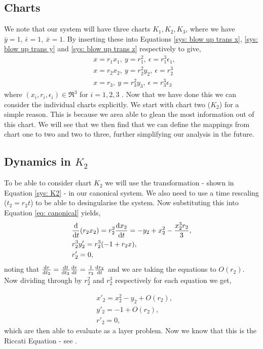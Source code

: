 \subsection{Charts}
We note that our system will have three charts $ K_1,K_2,K_3 $, where we have $ \bar{y}=1, \ \bar{\epsilon}=1, \ \bar{x}=1 $. By inserting these into Equations \ref{sys: blow up trans x}, \ref{sys: blow up trans y} and \ref{sys: blow up trans z} respectively to give, 
\begin{subequations}
	\begin{align}
	&x=r_1x_1, \ y=r_1^2, \ \epsilon=r_1^3\epsilon_1,\\
	&x=r_2x_2, \ y=r_2^2y_2, \ \epsilon=r_2^3 \label{sys: K2}\\
	&x=r_3, \ y=r_3^2y_3, \ \epsilon=r_3^3\epsilon_3\label{sys:K3}
	\end{align}
\end{subequations}
where $ (x_i,r_i,\epsilon_i)\in\Re^3 $ for $ i=1,2,3 $ \citep{krupa2001}. Now that we have done this we can consider the individual charts explicitly. We start with chart two ($K_2$) for a simple reason. This is because we area able to glean the most information out of this chart. We will see that we then find that we can define the mappings from chart one to two and two to three, further simplifying our analysis in the future.

\subsection{Dynamics in \texorpdfstring{$K_2$}{K2}} \label{sec: VDP K_2}
To be able to consider chart $ K_2 $ 
we will use the transformation - shown in Equation \ref{sys: K2} - in our canonical system. We also need to use a time rescaling ($ t_2=r_2t $) to be able to desingularise the system. Now substituting this into Equation \ref{eq: canonical} yields,
\begin{align}
&\od{}{t}(r_2x_2)=r_2^2\od{x_2}{t}=-y_2+x_2^2-\dfrac{x_2^3r_2}{3},\\
&r^3_2y'_2=r^3_2(-1+r_2x),\\
&r'_2=0,
\end{align}
noting that $ \od{r}{t_2}=\od{t}{t_2}\od{r}{t}=\frac{1}{r_2}\od{r_2}{t} $ and we are taking the equations to $ O(r_2) $. Now dividing through by $ r^2_2 $ and $ r^3_2 $ respectively for each equation we get,

\begin{equation}
	\begin{aligned}
		&x'_2=x^2_2-y_2+O(r_2),\\
		&y'_2=-1+O(r_2),\\
		&r'_2=0,
	\end{aligned}
\end{equation}
which are then able to evaluate as a layer problem. Now we know that this is the Riccati Equation - see \citet{Riccati}.

